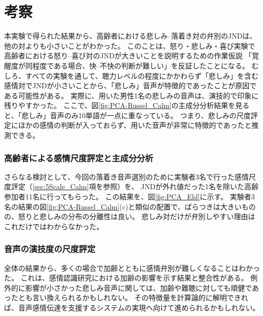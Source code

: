 \section{考察}
本実験で得られた結果から、高齢者における悲しみ--落着き対の弁別のJNDは、他の対よりも小さいことがわかった。
このことは、怒り・悲しみ・喜び実験で高齢者における怒り--喜び対のJNDが大きいことを説明するための作業仮説
「覚醒度が同程度である場合、快--不快の判断が難しい」を反証したことになる。
むしろ、すべての実験を通して、聴力レベルの程度にかかわらず「悲しみ」を含む感情対でJNDが小さいことから、「悲しみ」音声が特徴的であったことが原因である可能性がある。
実際に、用いた男性1名の悲しみの音声は、演技的で印象に残りやすかった。
ここで、図\ref{fig:PCA-Russel_Calm}の主成分分析結果を見ると、「悲しみ」音声のみ10単語が一点に重なっている。
つまり、悲しみの尺度評定にほかの感情の判断が入っておらず、用いた音声が非常に特徴的であったと推測できる。

\subsubsection{高齢者による感情尺度評定と主成分分析}
さらなる検討として、今回の落着き音声選別のために実験者3名で行った感情尺度評定（\ref{sec:5Scale_Calm}項を参照）を、
JNDが外れ値だった1名を除いた高齢参加者11名に行ってもらった。
この結果を、図\ref{fig:PCA_Eld}に示す。
実験者3名の結果の図\ref{fig:PCA-Russel_Calm}(c)と類似の配置で、ばらつきは大きいものの、怒りと悲しみの分布の分離性は良い。
悲しみ対だけが弁別しやすい理由はこれだけではわからなかった。

\subsubsection{音声の演技度の尺度評定}


全体の結果から、多くの場合で加齢とともに感情弁別が難しくなることはわかった。
これは、感情認識研究における加齢の影響を示す結果と整合性がある。
例外的に影響が小さかった悲しみ音声に関しては、加齢や難聴に対しても頑健であったとも言い換えられるかもしれない。
その特徴量を計算論的に解明できれば、音声感情伝達を支援するシステムの実現へ向けて進められるかもしれない。





